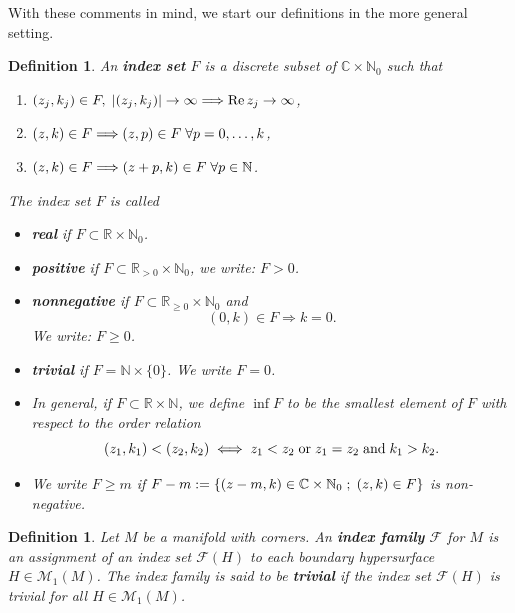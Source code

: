 \documentclass[a4paper,11pt]{article}
\newcounter{mythm}[section]
\newtheorem{defi}[mythm]{Definition}
\def\C{\mathbb{C}}
\def\R{\mathbb{R}}
\def\N{\mathbb{N}}
\begin{document}
With these comments in mind, we start our definitions in the more general setting. 
\begin{defi} \label{ind}
 An \textbf{index set} $F$ is a discrete subset of $\mathbb{C} \times \mathbb{N}_0$ such that 
 \begin{enumerate}
     \item  $\left(z_j, k_j\right) \in F, \hspace{0.1cm} \left|\left(z_j, k_j\right)\right| \rightarrow \infty \Longrightarrow \operatorname{Re} z_j \rightarrow \infty$,
     \item $(z, k) \in F \Longrightarrow(z, p) \in F \hspace{0.1cm}  \forall p=0, \ldots, k$, 
     \item  $(z, k) \in F \Longrightarrow(z+p, k) \in F \hspace{0.1cm} \forall p \in \mathbb{N}$.
 \end{enumerate}

The index set $F$ is called 
\begin{itemize}
 \item \textbf{real} if
$F \subset \R \times \N_{0}$.
\item   \textbf{positive} if
$F \subset \R_{>0} \times \N_{0}$, we write: $F > 0$. 
 \item \textbf{nonnegative} if $F \subset \R_{\geq 0} \times \N_{0}$ and 
$$
(0, k) \in F \Longrightarrow k=0 .
$$
We write: $F \geq 0$.
\item \textbf{trivial} if $F = \N \times \{ 0\}$. We write $F=0$.
\item In general, if $F \subset \R \times \N$, we define $\inf F$ to be the smallest element of $F$ with respect to the order relation 
$$
(z_1,k_1) < (z_2, k_2) \iff z_1 < z_2 \hspace{0.1cm} \text{or} \hspace{0.1cm} z_1 = z_2 \hspace{0.1cm} \text{and} \hspace{0.1cm} k_1 > k_2.
$$
\item We write $F \geq m$ if $F -m := \left\{ (z-m,k) \in \C \times \N_0 \hspace{0.1cm} ; \hspace{0.1cm} (z,k) \in F   \right\}$ is non-negative.
\end{itemize}
\end{defi}
\begin{defi}
  Let $M$ be a manifold with corners. An \textbf{index family} $\mathcal{F}$ for $M$ is an assignment of an index set $\mathcal{F}(H)$ to each boundary hypersurface $H \in \mathcal{M}_1(M)$. The index family is said to be \textbf{trivial} if the index set $\mathcal{F}(H)$ is trivial for all $H \in \mathcal{M}_1(M)$.
\end{defi}
\end{document}
